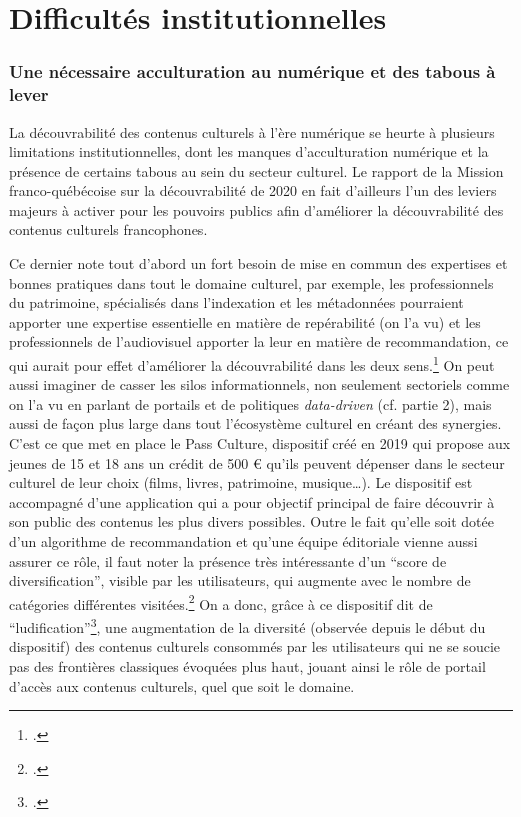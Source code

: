 \chapter{Difficultés institutionnelles}

\subsection{Une nécessaire acculturation au numérique et des tabous à lever}

La découvrabilité des contenus culturels à l’ère numérique se heurte à plusieurs limitations institutionnelles, dont les manques d’acculturation numérique et la présence de certains tabous au sein du secteur culturel. Le rapport de la Mission franco-québécoise sur la découvrabilité de 2020 en fait d’ailleurs l’un des leviers majeurs à activer pour les pouvoirs publics afin d’améliorer la découvrabilité des contenus culturels francophones. 

Ce dernier note tout d’abord un fort besoin de mise en commun des expertises et bonnes pratiques dans tout le domaine culturel, par exemple, les professionnels du patrimoine, spécialisés dans l’indexation et les métadonnées pourraient apporter une expertise essentielle en matière de repérabilité (on l’a vu) et les professionnels de l’audiovisuel apporter la leur en matière de recommandation, ce qui aurait pour effet d’améliorer la découvrabilité dans les deux sens.\footcite[p. 31]{ministeresdelaculturefranceetquebec2020} On peut aussi imaginer de casser les silos informationnels, non seulement sectoriels comme on l’a vu en parlant de portails et de politiques \textit{data-driven} (cf. partie 2), mais aussi de façon plus large dans tout l’écosystème culturel en créant des synergies. C’est ce que met en place le Pass Culture, dispositif créé en 2019 qui propose aux jeunes de 15 et 18 ans un crédit de 500 € qu’ils peuvent dépenser dans le secteur culturel de leur choix (films, livres, patrimoine, musique…). Le dispositif est accompagné d’une application qui a pour objectif principal de faire découvrir à son public des contenus les plus divers possibles. Outre le fait qu’elle soit dotée d’un algorithme de recommandation et qu’une équipe éditoriale vienne aussi assurer ce rôle, il faut noter la présence très intéressante d’un \enquote{score de diversification}, visible par les utilisateurs, qui augmente avec le nombre de catégories différentes visitées.\footcite{martinstocker} On a donc, grâce à ce dispositif dit de \enquote{ludification}\footcite{2024g}, une augmentation de la diversité (observée depuis le début du dispositif) des contenus culturels consommés par les utilisateurs qui ne se soucie pas des frontières classiques évoquées plus haut, jouant ainsi le rôle de portail d’accès aux contenus culturels, quel que soit le domaine.

